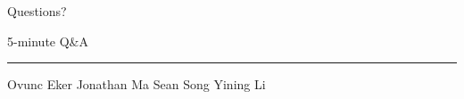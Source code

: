 \documentclass[aspectratio=169,10pt]{beamer}
\begin{document}
\begin{frame}[plain]
\vfill
\centering
{\color{HopkinsBlue}\Huge Questions?\par}
\vspace{.6em}
{\color{Muted}\large 5-minute Q\&A\par}
\vspace{1.2em}
{\color{SpiritBlue}\rule{2.3cm}{2pt}}\par
\vspace{1em}
{\small Ovunc Eker \quad Jonathan Ma \quad Sean Song \quad Yining Li}
\vfill
\end{frame}
\end{document}
